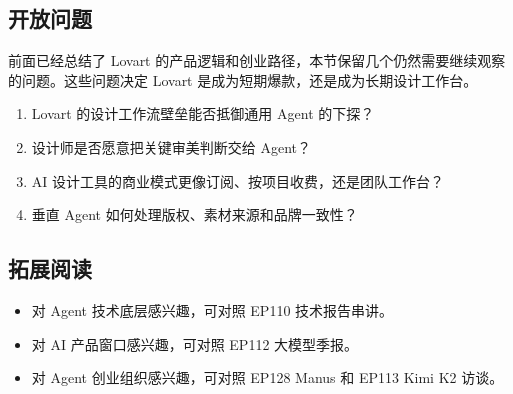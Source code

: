 \subsection{开放问题}

前面已经总结了 Lovart 的产品逻辑和创业路径，本节保留几个仍然需要继续观察的问题。这些问题决定 Lovart 是成为短期爆款，还是成为长期设计工作台。

\begin{enumerate}
\item Lovart 的设计工作流壁垒能否抵御通用 Agent 的下探？
\item 设计师是否愿意把关键审美判断交给 Agent？
\item AI 设计工具的商业模式更像订阅、按项目收费，还是团队工作台？
\item 垂直 Agent 如何处理版权、素材来源和品牌一致性？
\end{enumerate}

\subsection{拓展阅读}

\begin{itemize}
\item 对 Agent 技术底层感兴趣，可对照 EP110 技术报告串讲。
\item 对 AI 产品窗口感兴趣，可对照 EP112 大模型季报。
\item 对 Agent 创业组织感兴趣，可对照 EP128 Manus 和 EP113 Kimi K2 访谈。
\end{itemize}



